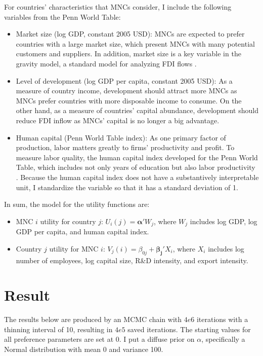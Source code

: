 For countries' characteristics that MNCs consider, I include the following
variables from the Penn World Table:

\begin{itemize}
\item Market size (log GDP, constant 2005 USD): MNCs are expected to prefer countries with a large market
  size, which present MNCs with many potential customers and suppliers. In
  addition, market size is a key variable in the gravity
  model, a standard model for analyzing FDI flows \citet{Bergstrand2007}.

\item Level of development (log GDP per capita, constant 2005 USD): As a measure
  of country income, development should attract more MNCs as MNCs prefer
  countries  with
  more disposable income to consume. On the other hand, as a measure of
  countries' capital
  abundance, development should reduce FDI inflow as MNCs' capital is no longer
  a big advantage.

\item Human capital (Penn World Table index): As one primary factor of
  production, labor matters greatly to firms' productivity and profit. To
  measure labor quality, the human capital index developed for the Penn World
  Table, which includes not only years of education but also labor productivity
  \citep{Feenstra2015}. Because the human capital index does not have a
  substantively interpretable unit, I standardize the variable so that it has a
  standard deviation of 1.
\end{itemize}

In sum, the model for the utility functions are:

\begin{itemize}
\item MNC $i$ utility for country $j$: $U_i(j) = \bm{\alpha}' W_j $, where $W_j$ includes log GDP, log GDP per capita, and human capital index.
\item Country $j$ utility for MNC $i$: $V_j(i) = \beta_{0j} + \bm{\beta_j}'
  X_i$, where $X_i$ includes log number of employees, log capital size, R\&D intensity, and
export intensity. 
\end{itemize}

\section{Result}
\label{sec:result}

The results below are produced by an MCMC chain with $4e6$ iterations with a
thinning interval of 10, resulting in $4e5$ saved iterations. The starting
values for all preference parameters are set at 0. I put a diffuse prior on
$\alpha$, specifically a Normal distribution with mean 0 and variance 100.

